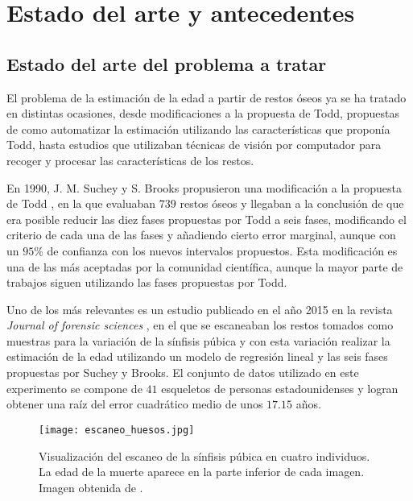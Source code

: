 \section{Estado del arte y antecedentes}

\subsection{Estado del arte del problema a tratar} \label{sec_estado_arte_problema}

El problema de la estimación de la edad a partir de restos óseos ya se ha tratado en distintas ocasiones, desde modificaciones a la propuesta de Todd, propuestas de como automatizar la estimación utilizando las características que proponía Todd, hasta estudios que utilizaban técnicas de visión por computador para recoger y procesar las características de los restos.

En 1990, J. M. Suchey y S. Brooks propusieron una modificación a la propuesta de Todd \cite{sucheyBrooks}, en la que evaluaban $739$ restos óseos y llegaban a la conclusión de que era posible reducir las diez fases propuestas por Todd a seis fases, modificando el criterio de cada una de las fases y añadiendo cierto error marginal, aunque con un $95\%$ de confianza con los nuevos intervalos propuestos. Esta modificación es una de las más aceptadas por la comunidad científica, aunque la mayor parte de trabajos siguen utilizando las fases propuestas por Todd.


Uno de los más relevantes es un estudio publicado en el año 2015 en la revista \textit{Journal of forensic sciences} \cite{modelandoHuesos3D}, en el que se escaneaban los restos tomados como muestras para la variación de la sínfisis púbica y con esta variación realizar la estimación de la edad utilizando un modelo de regresión lineal y las seis fases propuestas por Suchey y Brooks. El conjunto de datos utilizado en este experimento se compone de $41$ esqueletos de personas estadounidenses y logran obtener una raíz del error cuadrático medio de unos $17.15$ años.

\begin{figure}[H]
	\centering
	\texttt{[image: escaneo\_huesos.jpg]}
	\caption{Visualización del escaneo de la sínfisis púbica en cuatro individuos. La edad de la muerte aparece en la parte inferior de cada imagen. Imagen obtenida de \cite{modelandoHuesos3D}.}
	\label{fig:escaneo_huesos}
\end{figure}

